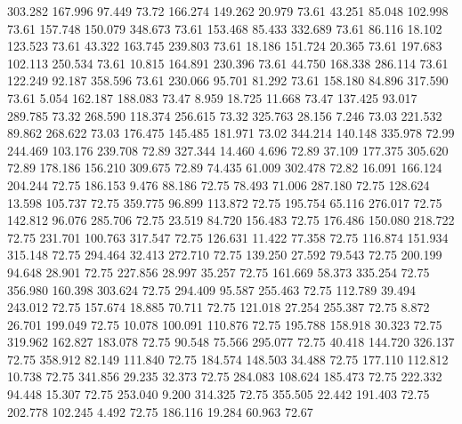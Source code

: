 303.282  167.996   97.449        73.72
 166.274  149.262   20.979        73.61
  43.251   85.048  102.998        73.61
 157.748  150.079  348.673        73.61
 153.468   85.433  332.689        73.61
  86.116   18.102  123.523        73.61
  43.322  163.745  239.803        73.61
  18.186  151.724   20.365        73.61
 197.683  102.113  250.534        73.61
  10.815  164.891  230.396        73.61
  44.750  168.338  286.114        73.61
 122.249   92.187  358.596        73.61
 230.066   95.701   81.292        73.61
 158.180   84.896  317.590        73.61
   5.054  162.187  188.083        73.47
   8.959   18.725   11.668        73.47
 137.425   93.017  289.785        73.32
 268.590  118.374  256.615        73.32
 325.763   28.156    7.246        73.03
 221.532   89.862  268.622        73.03
 176.475  145.485  181.971        73.02
 344.214  140.148  335.978        72.99
 244.469  103.176  239.708        72.89
 327.344   14.460    4.696        72.89
  37.109  177.375  305.620        72.89
 178.186  156.210  309.675        72.89
  74.435   61.009  302.478        72.82
  16.091  166.124  204.244        72.75
 186.153    9.476   88.186        72.75
  78.493   71.006  287.180        72.75
 128.624   13.598  105.737        72.75
 359.775   96.899  113.872        72.75
 195.754   65.116  276.017        72.75
 142.812   96.076  285.706        72.75
  23.519   84.720  156.483        72.75
 176.486  150.080  218.722        72.75
 231.701  100.763  317.547        72.75
 126.631   11.422   77.358        72.75
 116.874  151.934  315.148        72.75
 294.464   32.413  272.710        72.75
 139.250   27.592   79.543        72.75
 200.199   94.648   28.901        72.75
 227.856   28.997   35.257        72.75
 161.669   58.373  335.254        72.75
 356.980  160.398  303.624        72.75
 294.409   95.587  255.463        72.75
 112.789   39.494  243.012        72.75
 157.674   18.885   70.711        72.75
 121.018   27.254  255.387        72.75
   8.872   26.701  199.049        72.75
  10.078  100.091  110.876        72.75
 195.788  158.918   30.323        72.75
 319.962  162.827  183.078        72.75
  90.548   75.566  295.077        72.75
  40.418  144.720  326.137        72.75
 358.912   82.149  111.840        72.75
 184.574  148.503   34.488        72.75
 177.110  112.812   10.738        72.75
 341.856   29.235   32.373        72.75
 284.083  108.624  185.473        72.75
 222.332   94.448   15.307        72.75
 253.040    9.200  314.325        72.75
 355.505   22.442  191.403        72.75
 202.778  102.245    4.492        72.75
 186.116   19.284   60.963        72.67
